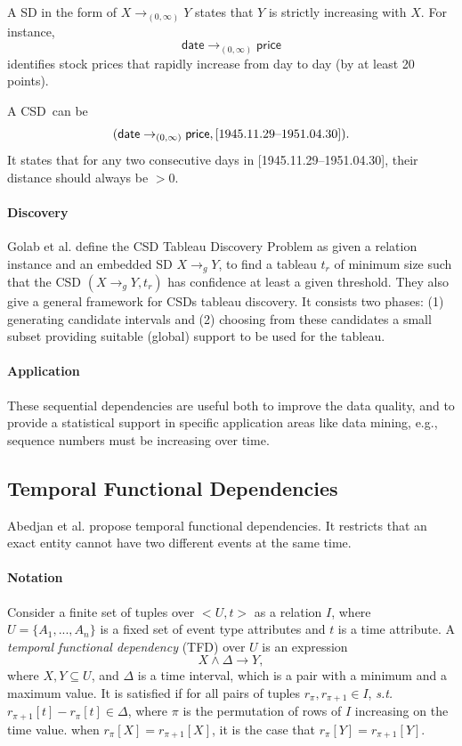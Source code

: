 \documentclass{article}
\begin{document}
A SD in the form of $X\rightarrow_{(0,\infty)} Y$ states that 
$Y$ is strictly increasing with $X$. 
For instance, 
$$\mathsf{date}\rightarrow_{(0,\infty)}\mathsf{price}$$ 
identifies stock prices that rapidly increase from day to day (by at least 20 points).
 
A CSD\ can be
$$(\mathsf{date}\rightarrow_{(0,\infty)}\mathsf{price}, \textnormal{[1945.11.29--1951.04.30]}).$$
It states that for any two consecutive days in [1945.11.29--1951.04.30], their distance should always be $>0$.

\paragraph{Discovery}
Golab et al. \cite{DBLP:journals/pvldb/GolabKKSS09} define the CSD Tableau Discovery Problem as
given a relation instance and an embedded SD $X\rightarrow_g Y$, to find a tableau $t_r$ of minimum size such that the CSD $(X\rightarrow_g Y, t_r)$ has confidence at least a given threshold.
They also give a general framework for CSDs tableau discovery.
It consists two phases:
(1) generating candidate intervals
and (2) choosing from these candidates a small subset providing suitable (global) support to be used for the tableau.



\paragraph{Application}
These sequential dependencies are useful both to improve the data quality, 
and to provide a statistical support in specific application areas like data mining, 
e.g., sequence numbers must be increasing over time.



\subsection{Temporal Functional Dependencies}
\label{sect-TFD}

Abedjan et al. \cite{DBLP:journals/pvldb/AbedjanAOPS15} propose temporal functional dependencies. It restricts that an exact entity cannot have two different events at the same time.

\paragraph{Notation}
Consider  a finite set of tuples over $<U, t>$ as a relation $I$, where $U = \{A_1, ... , A_n\}$ is a fixed set of event type attributes and $t$ is  a time attribute. A \emph{temporal functional dependency} (TFD) over $U$ is an expression 
$$X \wedge \Delta \rightarrow Y,$$
where  $X, Y \subseteq U$,
and $\Delta$ is a time interval, which is a pair with a minimum and a maximum value.
It is satisfied if for all pairs of tuples $r_{\pi}, r_{\pi + 1} \in I$, \emph{s.t.} $r_{\pi + 1}[t] - r_{\pi}[t] \in \Delta$,
where $\pi$ is the permutation of rows of $I$ increasing on the time value. when $r_{\pi}[X] = r_{\pi + 1}[X]$, it is the case that $r_{\pi}[Y] = r_{\pi + 1}[Y]$.
\end{document}
